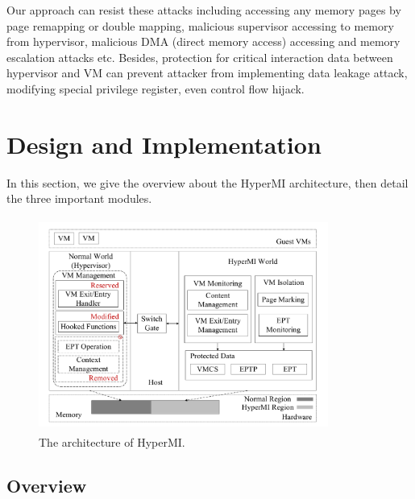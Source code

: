 \documentclass[conference]{IEEEtran}
\begin{document}

Our approach can resist these attacks including accessing any memory pages by page remapping or double mapping, malicious supervisor accessing to memory from hypervisor, malicious DMA (direct memory access) accessing and memory escalation attacks etc. Besides, protection for critical interaction data between hypervisor and VM can prevent attacker from implementing data leakage attack, modifying special privilege register, even control flow hijack.


\section{Design and Implementation}
In this section, we give the overview about the HyperMI architecture, then detail the three important modules.

\begin{figure}
\centerline{\includegraphics[width=9.5cm, height=7cm]{pdfvmcs1.pdf}}%
\caption{The architecture of HyperMI. } \label{fig1}
\end{figure}

\subsection{Overview} 
\end{document}
